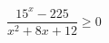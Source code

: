 \begin{ex}[type=inequality]
	\begin{condition}
		\( \dfrac{15^x-225}{x^2+8x+12}\ge0 \)
	\end{condition}
\end{ex}